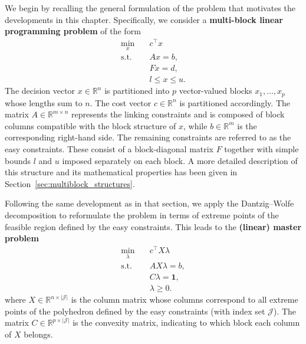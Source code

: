 \documentclass{book}
\theoremstyle{definition}
\numberwithin{algorithm_}{chapter}
\begin{document}
We begin by recalling the general formulation of the problem that motivates the developments in this chapter.  
Specifically, we consider a \textbf{multi-block linear programming problem} of the form
\begin{subequations}
\begin{align}
\min_{x} \quad & c^\top x \\
\text{s.t.} \quad 
& A x = b, \\
& F x = d, \\
& l \le x \le u.
\end{align}
\end{subequations}
The decision vector $x \in \mathbb{R}^n$ is partitioned into $p$ vector-valued blocks $x_1, \dots, x_p$ whose lengths sum to $n$.
The cost vector $c \in \mathbb{R}^n$ is partitioned accordingly.  
The matrix $A \in \mathbb{R}^{m \times n}$ represents the linking constraints and is composed of block columns compatible with the block structure of $x$, while $b \in \mathbb{R}^m$ is the corresponding right-hand side. The remaining constraints are referred to as the easy constraints. These consist of a block-diagonal matrix $F$ together with simple bounds $l$ and $u$ imposed separately on each block.  
A more detailed description of this structure and its mathematical properties has been given in Section~\ref{sec:multiblock_structures}.

\bigskip

Following the same development as in that section, we apply the Dantzig--Wolfe decomposition to reformulate the problem in terms of extreme points of the feasible region defined by the easy constraints. This leads to the \textbf{(linear) master problem}
\begin{subequations}
\begin{align}
\min_{\lambda} \quad & c^\top X \lambda \\
\text{s.t.} \quad 
& A X \lambda = b, \\
& C \lambda = \mathbf{1}, \\
& \lambda \ge 0.
\end{align}
\end{subequations}
where $X \in \mathbb{R}^{n \times |\mathcal{J}|}$ is the column matrix whose columns correspond to all extreme points of the polyhedron defined by the easy constraints (with index set $\mathcal{J}$).  
The matrix $C \in \mathbb{R}^{p \times |\mathcal{J}|}$ is the convexity matrix, indicating to which block each column of $X$ belongs.

\bigskip
\end{document}
